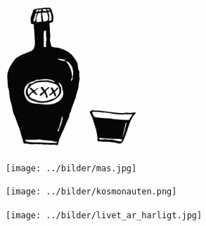%

\clearpage
{}
\begin{figure}[!b]
\begin{center}
\includegraphics[width=5cm]{../bilder/fardigabilder/BilderTillKapitel/brannvin.png} 
\end{center}
\end{figure}
\clearpage

\clearpage



\clearpage


\clearpage


%
\clearpage

\begin{figure}[!b]
\begin{center}
\texttt{[image: ../bilder/mas.jpg]} 
\end{center}
\end{figure}
\clearpage

\clearpage

\clearpage

\clearpage

\clearpage

\clearpage


%
\clearpage


\clearpage


\clearpage

\clearpage

\begin{figure}[!t]
\begin{center}
\texttt{[image: ../bilder/kosmonauten.png]} 
\end{center}
\end{figure}
\vspace{25mm}

\begin{figure}[!b]
\begin{center}
\texttt{[image: ../bilder/livet\_ar\_harligt.jpg]} 
\end{center}
\end{figure}
